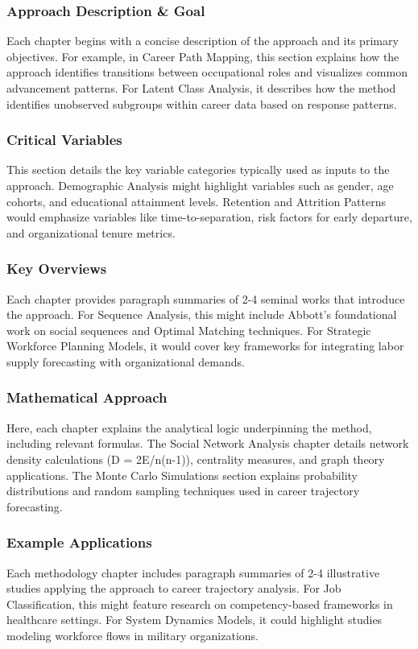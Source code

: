 \documentclass[./main.tex]{subfiles}
\begin{document}
\subsubsection{Approach Description \& Goal}\label{approach-description-goal}
Each chapter begins with a concise description of the approach and its primary objectives. For example, in Career Path Mapping, this section explains how the approach identifies transitions between occupational roles and visualizes common advancement patterns. For Latent Class Analysis, it describes how the method identifies unobserved subgroups within career data based on response patterns.

\subsubsection{Critical Variables}\label{critical-variables}
This section details the key variable categories typically used as inputs to the approach. Demographic Analysis might highlight variables such as gender, age cohorts, and educational attainment levels. Retention and Attrition Patterns would emphasize variables like time-to-separation, risk factors for early departure, and organizational tenure metrics.

\subsubsection{Key Overviews}\label{key-overviews}
Each chapter provides paragraph summaries of 2-4 seminal works that introduce the approach. For Sequence Analysis, this might include Abbott's foundational work on social sequences and Optimal Matching techniques. For Strategic Workforce Planning Models, it would cover key frameworks for integrating labor supply forecasting with organizational demands.

\subsubsection{Mathematical Approach}\label{mathematical-approach}
Here, each chapter explains the analytical logic underpinning the method, including relevant formulas. The Social Network Analysis chapter details network density calculations (D = 2E/n(n-1)), centrality measures, and graph theory applications. The Monte Carlo Simulations section explains probability distributions and random sampling techniques used in career trajectory forecasting.

\subsubsection{Example Applications}\label{example-applications}
Each methodology chapter includes paragraph summaries of 2-4 illustrative studies applying the approach to career trajectory analysis. For Job Classification, this might feature research on competency-based frameworks in healthcare settings. For System Dynamics Models, it could highlight studies modeling workforce flows in military organizations.
\end{document}
